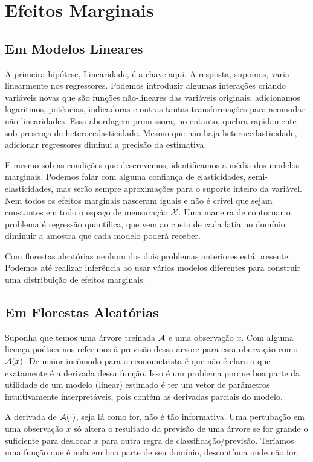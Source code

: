 \section{Efeitos Marginais}
\subsection{Em Modelos Lineares}
A primeira hipótese, Linearidade, é a chave aqui. A resposta, supomos, varia linearmente nos regressores. Podemos introduzir algumas interações criando variáveis novas que são funções não-lineares das variáveis originais, adicionamos logaritmos, potências, indicadoras e outras tantas transformações para acomodar não-linearidades. Essa abordagem promissora, no entanto, quebra rapidamente sob presença de heterocedasticidade. Mesmo que não haja heterocedasticidade, adicionar regressores diminui a precisão da estimativa.

E mesmo sob as condições que descrevemos, identificamos a média dos modelos marginais. Podemos falar com alguma confiança de elasticidades, semi-elasticidades, mas serão sempre aproximações para o suporte inteiro da variável. Nem todos os efeitos marginais nasceram iguais e não é crível que sejam constantes em todo o espaço de mensuração $\mathcal{X}$. Uma maneira de contornar o problema é regressão quantílica, que vem ao custo de cada fatia no domínio diminuir a amostra que cada modelo poderá receber.





Com florestas aleatórias nenhum dos dois problemas anteriores está presente. Podemos até realizar inferência ao usar vários modelos diferentes para construir uma distribuição de efeitos marginais. 

\subsection{Em Florestas Aleatórias}

Suponha que temos uma árvore treinada $\mathcal{A}$ e uma observação $x$. Com alguma licença poética nos referimos à previsão dessa árvore para essa obervação como $\mathcal{A}(x)$. De maior incômodo para o econometrista é que não é claro o que exatamente é a derivada dessa função. Isso é um problema porque boa parte da utilidade de um modelo (linear) estimado é ter um vetor de parâmetros intuitivamente interpretáveis, pois contém as derivadas parciais do modelo. 

A derivada de $\mathcal{A}(\cdot)$, seja lá como for, não é tão informativa. Uma pertubação em uma observação $x$ só altera o resultado da previsão de uma árvore se for grande o suficiente para deslocar $x$ para outra regra de classificação/previsão. Teríamos uma função que é nula em boa parte de seu domínio, descontínua onde não for. 

